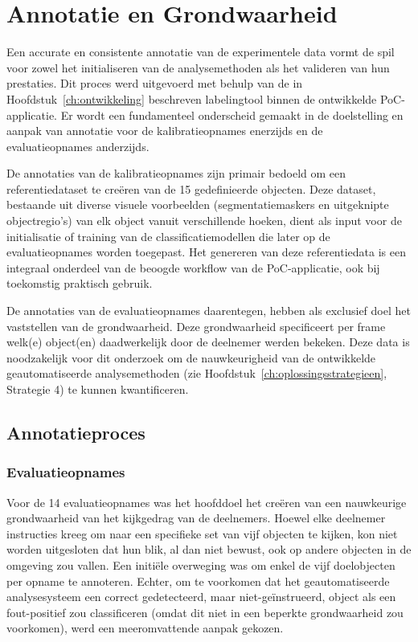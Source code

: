 \section{Annotatie en Grondwaarheid}

Een accurate en consistente annotatie van de experimentele data vormt de spil voor zowel het 
initialiseren van de analysemethoden als het valideren van hun prestaties. 
Dit proces werd uitgevoerd met behulp van de in Hoofdstuk~\ref{ch:ontwikkeling} beschreven labelingtool binnen de ontwikkelde PoC-applicatie. 
Er wordt een fundamenteel onderscheid gemaakt in de doelstelling en aanpak van annotatie voor de 
kalibratieopnames enerzijds en de evaluatieopnames anderzijds.

De annotaties van de kalibratieopnames zijn primair bedoeld om een referentiedataset te creëren van de 15 gedefinieerde objecten. 
Deze dataset, bestaande uit diverse visuele voorbeelden (segmentatiemaskers en uitgeknipte objectregio's) 
van elk object vanuit verschillende hoeken, 
dient als input voor de initialisatie of training van de classificatiemodellen die later op de evaluatieopnames worden toegepast. 
Het genereren van deze referentiedata is een integraal onderdeel van de beoogde workflow van de PoC-applicatie, 
ook bij toekomstig praktisch gebruik.

De annotaties van de evaluatieopnames daarentegen, hebben als exclusief doel het vaststellen van de grondwaarheid. 
Deze grondwaarheid specificeert per frame welk(e) object(en) daadwerkelijk door de deelnemer werden bekeken. 
Deze data is noodzakelijk voor dit onderzoek om de nauwkeurigheid van de ontwikkelde geautomatiseerde analysemethoden 
(zie Hoofdstuk~\ref{ch:oplossingsstrategieen}, Strategie 4) te kunnen kwantificeren. 

\subsection{Annotatieproces}

\subsubsection{Evaluatieopnames}

Voor de 14 evaluatieopnames was het hoofddoel het creëren van een nauwkeurige grondwaarheid van het kijkgedrag van de deelnemers. 
Hoewel elke deelnemer instructies kreeg om naar een specifieke set van vijf objecten te kijken, kon niet worden uitgesloten dat hun blik, 
al dan niet bewust, ook op andere objecten in de omgeving zou vallen. 
Een initiële overweging was om enkel de vijf doelobjecten per opname te annoteren. 
Echter, om te voorkomen dat het geautomatiseerde analysesysteem een correct gedetecteerd, maar niet-geïnstrueerd, 
object als een fout-positief zou classificeren (omdat dit niet in een beperkte grondwaarheid zou voorkomen), 
werd een meeromvattende aanpak gekozen.

